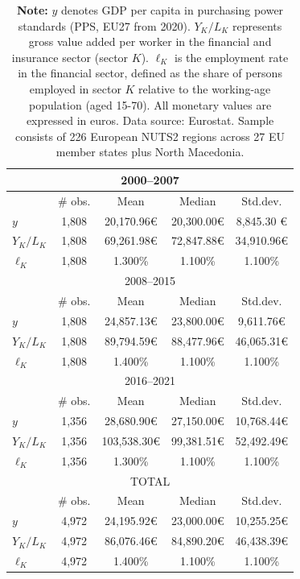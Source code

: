 \documentclass[a4paper,11pt,oneside]{article}
\begin{document}
\begin{table}
\centering
\caption{Descriptive statistics for all NUTS 2 regions across subperiods and for the full sample}
\label{tbl:descriptive_statistics}
\footnotesize
\begin{tabular}{lcccc}
\toprule
\multicolumn{5}{c}{2000--2007}              \\
\midrule
      & \# obs. & Mean         & Median      & Std.dev.    \\
\midrule      
$y$ & 1,808   & 20,170.96\euro  & 20,300.00\euro & 8,845.30 €  \\
$Y_K/L_K$  & 1,808   & 69,261.98\euro  & 72,847.88\euro & 34,910.96\euro \\
$\ell_K$   & 1,808   & 1.300\%     & 1.100\%    & 1.100\%    \\
\midrule
\multicolumn{5}{c}{2008--2015}                            \\
\midrule
      & \# obs. & Mean         & Median      & Std.dev.    \\
\midrule      
$y$ & 1,808   & 24,857.13\euro  & 23,800.00\euro & 9,611.76\euro  \\
$Y_K/L_K$  & 1,808   & 89,794.59\euro  & 88,477.96\euro & 46,065.31\euro \\
$\ell_K$  & 1,808   & 1.400\%    & 1.100\%    & 1.100\%    \\
\midrule
\multicolumn{5}{c}{2016--2021}                            \\
\midrule
      & \# obs. & Mean         & Median      & Std.dev.    \\
\midrule      
$y$ & 1,356   & 28,680.90\euro  & 27,150.00\euro & 10,768.44\euro \\
$Y_K/L_K$  & 1,356   & 103,538.30\euro & 99,381.51\euro & 52,492.49\euro \\
$\ell_K$  & 1,356   & 1.300\%     & 1.100\%    & 1.100\%    \\
\midrule
\multicolumn{5}{c}{TOTAL}                                  \\
\midrule
      & \# obs. & Mean         & Median      & Std.dev.    \\
\midrule      
$y$ & 4,972   & 24,195.92\euro  & 23,000.00\euro & 10,255.25\euro \\
$Y_K/L_K$  & 4,972   & 86,076.46\euro  & 84,890.20\euro & 46,438.39\euro \\
$\ell_K$  & 4,972   & 1.400\%     & 1.100\%   & 1.100\% \\
\bottomrule
\end{tabular}
\caption*{\footnotesize \textbf{Note:} $y$ denotes GDP per capita in 
purchasing power standards (PPS, EU27 from 2020). $Y_K/L_K$ represents 
gross value added per worker in the financial and insurance sector (sector $K$). 
$\ell_K$ is the employment rate in the financial sector, defined as the share 
of persons employed in sector $K$ relative to the working-age population 
(aged 15-70). All monetary values are expressed in euros. Data source: 
Eurostat. Sample consists of 226 European NUTS2 regions across 27 EU member 
states plus North Macedonia.}
\end{table}
\end{document}

